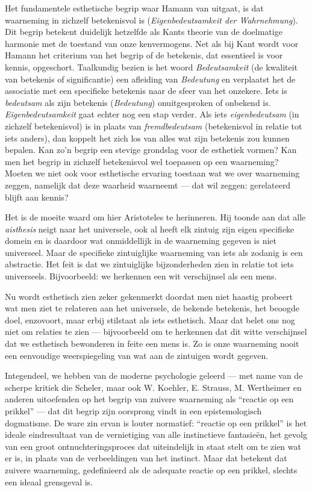 Het fundamentele esthetische begrip waar Hamann van uitgaat, is dat waarneming in zichzelf betekenisvol is (\textit{Eigenbedeutsamkeit der Wahrnehmung}). Dit begrip betekent duidelijk hetzelfde als Kants theorie van de doelmatige harmonie met de toestand van onze kenvermogens. Net als bij Kant wordt voor Hamann het criterium van het begrip of de betekenis, dat essentieel is voor kennis, opgeschort. Taalkundig bezien is het woord \textit{Bedeutsamkeit} (de kwaliteit van betekenis of significantie) een afleiding van \textit{Bedeutung} en verplaatst het de associatie met een specifieke betekenis naar de sfeer van het onzekere. Iets is \textit{bedeutsam} als zijn betekenis (\textit{Bedeutung}) onuitgesproken of onbekend is. \textit{Eigenbedeutsamkeit} gaat echter nog een stap verder. Als iets \textit{eigenbedeutsam} (in zichzelf betekenisvol) is in plaats van \textit{fremdbedeutsam} (betekenisvol in relatie tot iets anders), dan koppelt het zich los van alles wat zijn betekenis zou kunnen bepalen. Kan zo’n begrip een stevige grondslag voor de esthetiek vormen? Kan men het begrip in zichzelf betekenisvol wel toepassen op een waarneming? Moeten we niet ook voor esthetische ervaring toestaan wat we over waarneming zeggen, namelijk dat deze waarheid waarneemt — dat wil zeggen: gerelateerd blijft aan kennis?

Het is de moeite waard om hier Aristoteles te herinneren. Hij toonde aan dat alle \textit{aisthesis} neigt naar het universele, ook al heeft elk zintuig zijn eigen specifieke domein en is daardoor wat onmiddellijk in de waarneming gegeven is niet universeel. Maar de specifieke zintuiglijke waarneming van iets als zodanig is een abstractie. Het feit is dat we zintuiglijke bijzonderheden zien in relatie tot iets universeels. Bijvoorbeeld: we herkennen een wit verschijnsel als een mens.

Nu wordt esthetisch zien zeker gekenmerkt doordat men niet haastig probeert wat men ziet te relateren aan het universele, de bekende betekenis, het beoogde doel, enzovoort, maar erbij stilstaat als iets esthetisch. Maar dat belet ons nog niet om relaties te zien — bijvoorbeeld om te herkennen dat dit witte verschijnsel dat we esthetisch bewonderen in feite een mens is. Zo is onze waarneming nooit een eenvoudige weerspiegeling van wat aan de zintuigen wordt gegeven.

Integendeel, we hebben van de moderne psychologie geleerd — met name van de scherpe kritiek die Scheler, maar ook W. Koehler, E. Strauss, M. Wertheimer en anderen uitoefenden op het begrip van zuivere waarneming als ``reactie op een prikkel'' — dat dit begrip zijn oorsprong vindt in een epistemologisch dogmatisme. De ware zin ervan is louter normatief: ``reactie op een prikkel'' is het ideale eindresultaat van de vernietiging van alle instinctieve fantasieën, het gevolg van een groot ontnuchteringsproces dat uiteindelijk in staat stelt om te zien wat er is, in plaats van de verbeeldingen van het instinct. Maar dat betekent dat zuivere waarneming, gedefinieerd als de adequate reactie op een prikkel, slechts een ideaal grensgeval is.

